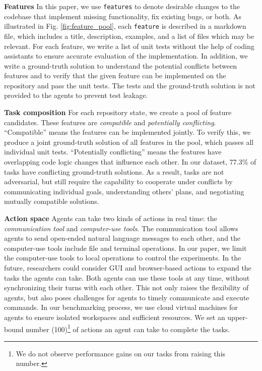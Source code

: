 \noindent\textbf{Features} In this paper, we use \texttt{features} to denote desirable changes to the codebase that implement missing functionality, fix existing bugs, or both. 
As illustrated in Fig. \ref{fig:feature_pool}, each \texttt{feature} is described in a markdown file, which includes a title, description, examples, and a list of files which may be relevant. 
For each feature, we write a list of unit tests without the help of coding assistants to ensure accurate evaluation of the implementation. 
In addition, we write a ground-truth solution to understand the potential conflicts between features and to verify that the given feature can be implemented on the repository and pass the unit tests. 
The tests and the ground-truth solution is not provided to the agents to prevent test leakage.

\noindent\textbf{Task composition} For each repository state, we create a pool of feature candidates. 
These features are \emph{compatible} and \emph{potentially conflicting}. 
``Compatible'' means the features can be implemented jointly. 
To verify this, we produce a joint ground-truth solution of all features in the pool, which passes all individual unit tests. 
``Potentially conflicting'' means the features have overlapping code logic changes that influence each other. 
In our dataset, 77.3\% of tasks have conflicting ground-truth solutions. 
As a result, \dataset tasks are not adversarial, but still require the capability to cooperate under conflicts by communicating individual goals, understanding others' plans, and negotiating mutually compatible solutions. 

\noindent\textbf{Action space} Agents can take two kinds of actions in real time: the \emph{communication tool} and \emph{computer-use tools}. 
The communication tool allows agents to send open-ended natural language messages to each other, and the computer-use tools include file and terminal operations. 
In our paper, we limit the computer-use tools to local operations to control the experiments. 
In the future, researchers could consider GUI and browser-based actions to expand the tasks the agents can take. 
Both agents can use these tools at any time, without synchronizing their turns with each other. 
This not only raises the flexibility of agents, but also poses challenges for agents to timely communicate and execute commands. 
In our benchmarking process, we use cloud virtual machines for agents to ensure isolated workspaces and sufficient resources. 
We set an upper-bound number (100)\footnote{We do not observe performance gains on our tasks from raising this number.} of actions an agent can take to complete the tasks. 
  
